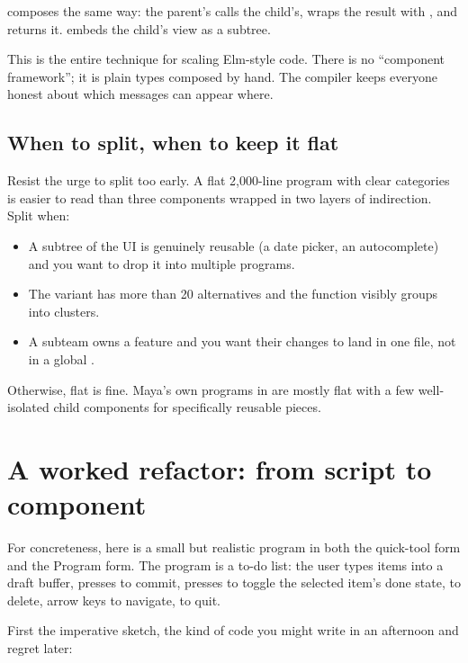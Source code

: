  composes the same way: the parent's
 calls the child's, wraps the result with
, and returns it.  embeds the
child's view as a subtree.

This is the entire technique for scaling Elm-style code. There is no
``component framework''; it is plain \cpp{} types composed by
hand. The compiler keeps everyone honest about which messages can
appear where.

\subsection{When to split, when to keep it flat}

Resist the urge to split too early. A flat 2,000-line program with
clear  categories is easier to read than three components
wrapped in two layers of  indirection. Split when:

\begin{itemize}[leftmargin=*]
  \item A subtree of the UI is genuinely reusable (a date picker,
    an autocomplete) and you want to drop it into multiple
    programs.
  \item The  variant has more than 20 alternatives and the
     function visibly groups into clusters.
  \item A subteam owns a feature and you want their changes to land
    in one file, not in a global .
\end{itemize}

Otherwise, flat is fine. Maya's own programs in  are
mostly flat with a few well-isolated child components for
specifically reusable pieces.

\section{A worked refactor: from script to component}
\label{sec:elm:worked-refactor}

For concreteness, here is a small but realistic program in both the
quick-tool form and the Program form. The program is a to-do list:
the user types items into a draft buffer, presses  to
commit, presses  to toggle the selected item's done
state,  to delete, arrow keys to navigate,  to quit.

First the imperative sketch, the kind of code you might write in an
afternoon and regret later:

